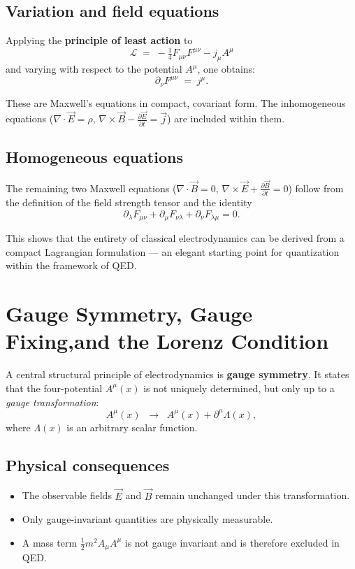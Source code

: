 \subsection*{Variation and field equations}
Applying the \textbf{principle of least action} to
\[
\mathcal{L} \;=\; -\tfrac{1}{4} F_{\mu\nu}F^{\mu\nu} - j_\mu A^\mu
\]
and varying with respect to the potential \( A^\mu \), one obtains:
\[
\partial_\nu F^{\mu\nu} \;=\; j^\mu .
\]

These are Maxwell’s equations in compact, 
covariant form. The inhomogeneous equations
(\( \nabla \cdot \vec{E} = \rho, \, \nabla \times \vec{B} - \tfrac{\partial \vec{E}}{\partial t} = \vec{j} \))
are included within them.

\subsection*{Homogeneous equations}
The remaining two Maxwell equations 
(\( \nabla \cdot \vec{B} = 0, \, \nabla \times \vec{E} + \tfrac{\partial \vec{B}}{\partial t} = 0 \))
follow from the definition of the field strength tensor
and the identity
\[
\partial_\lambda F_{\mu\nu} + \partial_\mu F_{\nu\lambda} + \partial_\nu F_{\lambda\mu} = 0 .
\]

\medskip
This shows that the entirety of classical electrodynamics 
can be derived from a compact Lagrangian formulation — 
an elegant starting point for quantization within the framework of QED.
\section{Gauge Symmetry, Gauge Fixing,\newline and the  Lorenz Condition}
\label{anhangA:eichsymmetrie}

A central structural principle of electrodynamics is \textbf{gauge symmetry}.
It states that the four-potential \( A^\mu(x) \) is not uniquely determined,
but only up to a \emph{gauge transformation}:
\[
A^\mu(x) \;\;\rightarrow\;\; A^\mu(x) + \partial^\mu \Lambda(x),
\]
where \( \Lambda(x) \) is an arbitrary scalar function.

\subsection*{Physical consequences}
\begin{itemize}
	\item The observable fields \( \vec{E} \) and \( \vec{B} \) 
	remain unchanged under this transformation.
	\item Only gauge-invariant quantities are physically measurable.
	\item A mass term \( \tfrac{1}{2} m^2 A_\mu A^\mu \) 
	is not gauge invariant and is therefore excluded in QED.
\end{itemize}

